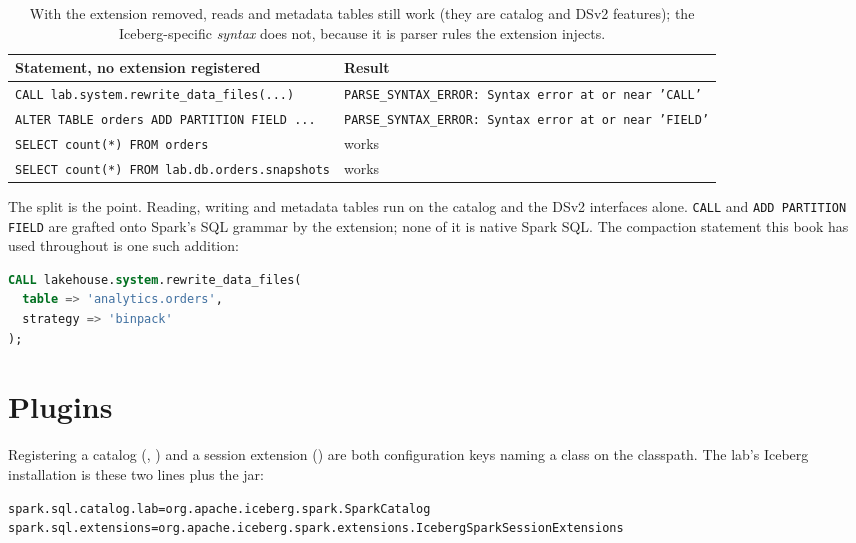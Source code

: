 \begin{table}[htbp]
\centering\footnotesize
\renewcommand{\arraystretch}{1.2}
\begin{tabular}{@{}P{5.4cm}P{8.8cm}@{}}
\toprule
\textbf{Statement, no extension registered} & \textbf{Result} \\
\midrule
\texttt{CALL lab.system.rewrite\_data\_files(...)} & \texttt{PARSE\_SYNTAX\_ERROR: Syntax error at or near 'CALL'} \\
\texttt{ALTER TABLE orders ADD PARTITION FIELD ...} & \texttt{PARSE\_SYNTAX\_ERROR: Syntax error at or near 'FIELD'} \\
\texttt{SELECT count(*) FROM orders} & works \\
\texttt{SELECT count(*) FROM lab.db.orders.snapshots} & works \\
\bottomrule
\end{tabular}
\caption{With the extension removed, reads and metadata tables still work (they are
catalog and DSv2 features); the Iceberg-specific \emph{syntax} does not, because it
is parser rules the extension injects.}
\label{tab:dsv2-noext}
\end{table}

The split is the point. Reading, writing and metadata tables run on the catalog and
the DSv2 interfaces alone. \texttt{CALL} and \texttt{ADD PARTITION FIELD} are
grafted onto Spark's SQL grammar by the extension; none of it is native Spark SQL.
The compaction statement this book has used throughout is one such addition:

\begin{lstlisting}[language=SQL,caption={A procedure call, available only with the Iceberg extension registered},captionpos=b,label=lst:dsv2-call]
CALL lakehouse.system.rewrite_data_files(
  table => 'analytics.orders',
  strategy => 'binpack'
);
\end{lstlisting}

\section{Plugins}
\label{sec:dsv2-plugins}

Registering a catalog (, )
and a session extension () are both configuration keys
naming a class on the classpath. The lab's Iceberg installation is these two lines
plus the jar:

\begin{lstlisting}[language=bash,numbers=none,caption={The whole mechanism by which Iceberg is ``installed'' into a Spark session},captionpos=b,label=lst:dsv2-install]
spark.sql.catalog.lab=org.apache.iceberg.spark.SparkCatalog
spark.sql.extensions=org.apache.iceberg.spark.extensions.IcebergSparkSessionExtensions
\end{lstlisting}

